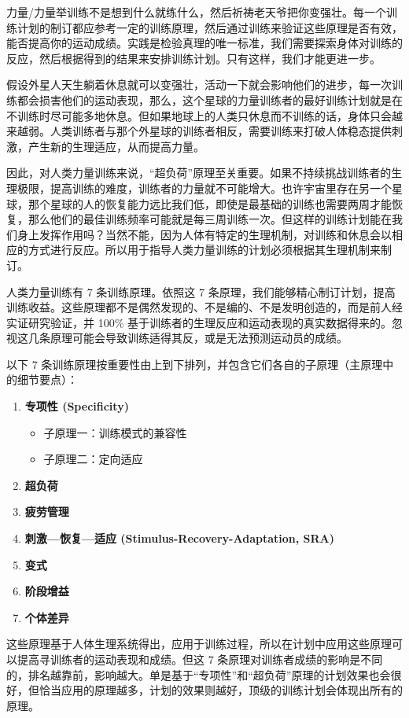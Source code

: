 \documentclass[fontset=fandol, a4paper, 12pt, openright]{ctexbook}
\begin{document}
力量/力量举训练不是想到什么就练什么，然后祈祷老天爷把你变强壮。每一个训练计划的制订都应参考一定的训练原理，然后通过训练来验证这些原理是否有效，能否提高你的运动成绩。实践是检验真理的唯一标准，我们需要探索身体对训练的反应，然后根据得到的结果来安排训练计划。只有这样，我们才能更进一步。

假设外星人天生躺着休息就可以变强壮，活动一下就会影响他们的进步，每一次训练都会损害他们的运动表现，那么，这个星球的力量训练者的最好训练计划就是在不训练时尽可能多地休息。但如果地球上的人类只休息而不训练的话，身体只会越来越弱。人类训练者与那个外星球的训练者相反，需要训练来打破人体稳态提供刺激，产生新的生理适应，从而提高力量。

因此，对人类力量训练来说，“超负荷”原理至关重要。如果不持续挑战训练者的生理极限，提高训练的难度，训练者的力量就不可能增大。也许宇宙里存在另一个星球，那个星球的人的恢复能力远比我们低，即使是最基础的训练也需要两周才能恢复，那么他们的最佳训练频率可能就是每三周训练一次。但这样的训练计划能在我们身上发挥作用吗？当然不能，因为人体有特定的生理机制，对训练和休息会以相应的方式进行反应。所以用于指导人类力量训练的计划必须根据其生理机制来制订。

人类力量训练有 7 条训练原理。依照这 7 条原理，我们能够精心制订计划，提高训练收益。这些原理都不是偶然发现的、不是编的、不是发明创造的，而是前人经实证研究验证，并 100\% 基于训练者的生理反应和运动表现的真实数据得来的。忽视这几条原理可能会导致训练适得其反，或是无法预测运动员的成绩。

以下 7 条训练原理按重要性由上到下排列，并包含它们各自的子原理（主原理中的细节要点）：

\begin{enumerate}
    \item \textbf{专项性 (Specificity)}
    \begin{itemize}
        \item 子原理一：训练模式的兼容性
        \item 子原理二：定向适应
    \end{itemize}
    \item \textbf{超负荷}
    \item \textbf{疲劳管理}
    \item \textbf{刺激—恢复—适应 (Stimulus-Recovery-Adaptation, SRA)}
    \item \textbf{变式}
    \item \textbf{阶段增益}
    \item \textbf{个体差异}
\end{enumerate}

这些原理基于人体生理系统得出，应用于训练过程，所以在计划中应用这些原理可以提高寻训练者的运动表现和成绩。但这 7 条原理对训练者成绩的影响是不同的，排名越靠前，影响越大。单是基于“专项性”和“超负荷”原理的计划效果也会很好，但恰当应用的原理越多，计划的效果则越好，顶级的训练计划会体现出所有的原理。
\end{document}
